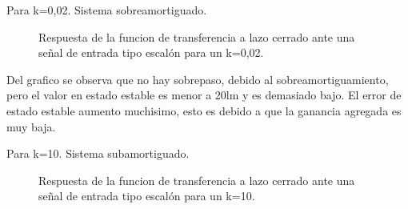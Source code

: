 \documentclass[a4paper,11pt]{article}
\begin{document}
Para k=0,02. Sistema sobreamortiguado.

  \begin{figure}[H] %
	\caption{Respuesta de la funcion de transferencia a lazo cerrado ante una señal de entrada tipo escalón para un k=0,02.}
	\label{fig:resp_esc3}
	\end{figure} 

Del grafico se observa que no hay sobrepaso, debido al sobreamortiguamiento, pero el valor en estado estable es menor a 20lm y es demasiado bajo. El error de estado estable aumento muchisimo, esto es debido a que la ganancia agregada es muy baja.

Para k=10. Sistema subamortiguado.

  \begin{figure}[H] %
	\caption{Respuesta de la funcion de transferencia a lazo cerrado ante una señal de entrada tipo escalón para un k=10.}
	\label{fig:resp_esc4}
	\end{figure} 
\end{document}
